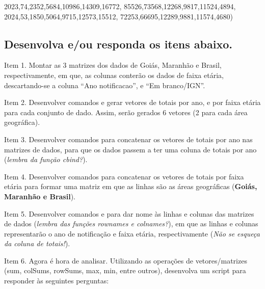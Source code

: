 \documentclass[
]{article}
\newenvironment{Shaded}{\begin{snugshade}}{\end{snugshade}}
\newcommand{\DecValTok}[1]{\textcolor[rgb]{0.00,0.00,0.81}{#1}}
\newcommand{\NormalTok}[1]{#1}
\begin{document}
\begin{Shaded}
\begin{Highlighting}[]
                  \DecValTok{2023}\NormalTok{,}\DecValTok{74}\NormalTok{,}\DecValTok{2352}\NormalTok{,}\DecValTok{5684}\NormalTok{,}\DecValTok{10986}\NormalTok{,}\DecValTok{14309}\NormalTok{,}\DecValTok{16772}\NormalTok{,}
                    \DecValTok{85526}\NormalTok{,}\DecValTok{73568}\NormalTok{,}\DecValTok{12268}\NormalTok{,}\DecValTok{9817}\NormalTok{,}\DecValTok{11524}\NormalTok{,}\DecValTok{4894}\NormalTok{,}
                  \DecValTok{2024}\NormalTok{,}\DecValTok{53}\NormalTok{,}\DecValTok{1850}\NormalTok{,}\DecValTok{5064}\NormalTok{,}\DecValTok{9715}\NormalTok{,}\DecValTok{12573}\NormalTok{,}\DecValTok{15512}\NormalTok{,}
                    \DecValTok{72253}\NormalTok{,}\DecValTok{66695}\NormalTok{,}\DecValTok{12289}\NormalTok{,}\DecValTok{9881}\NormalTok{,}\DecValTok{11574}\NormalTok{,}\DecValTok{4680}\NormalTok{)}
\end{Highlighting}
\end{Shaded}

\subsection{Desenvolva e/ou responda os itens
abaixo.}\label{desenvolva-eou-responda-os-itens-abaixo.}

Item 1. Montar as 3 matrizes dos dados de Goiás, Maranhão e Brasil,
respectivamente, em que, as colunas conterão os dados de faixa etária,
descartando-se a coluna ``Ano notificacao'', e ``Em branco/IGN''.

Item 2. Desenvolver comandos e gerar vetores de totais por ano, e por
faixa etária para cada conjunto de dado. Assim, serão gerados 6 vetores
(2 para cada área geográfica).

Item 3. Desenvolver comandos para concatenar os vetores de totais por
ano nas matrizes de dados, para que os dados passem a ter uma coluna de
totais por ano (\emph{lembra da função cbind?}).

Item 4. Desenvolver comandos para concatenar os vetores de totais por
faixa etária para formar uma matriz em que as linhas são as áreas
geográficas (\textbf{Goiás, Maranhão e Brasil}).

Item 5. Desenvolver comandos e para dar nome às linhas e colunas das
matrizes de dados (\emph{lembra das funções rownames e colnames?}), em
que as linhas e colunas representarão o ano de notificação e faixa
etária, respectivamente (\emph{Não se esqueça da coluna de totais!}).

Item 6. Agora é hora de analisar. Utilizando as operações de
vetores/matrizes (sum, colSums, rowSums, max, min, entre outros),
desenvolva um script para responder às seguintes perguntas:
\end{document}
